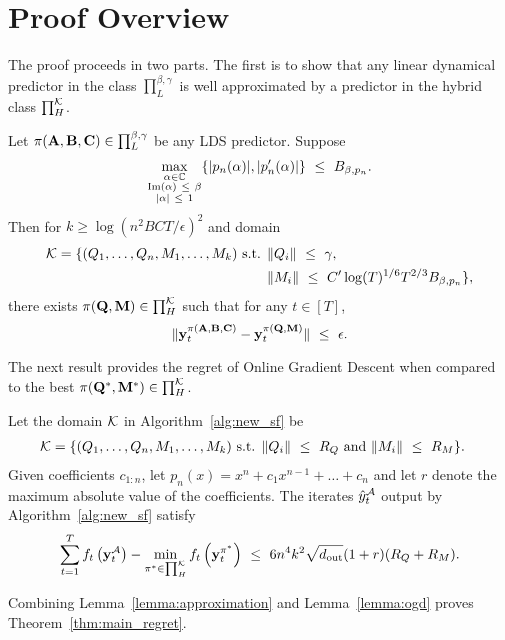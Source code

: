 \section{Proof Overview}
The proof proceeds in two parts. The first is to show that any linear dynamical predictor in the class $\prod_{L}^{\beta, \gamma }$ is well approximated by a predictor in the hybrid class $\prod_{H}^{\mathcal{K}}$. 
\begin{lemma}
\label{lemma:approximation}
    Let $\pi(\mathbf{A}, \mathbf{B}, \mathbf{C}) \in \prod_{L}^{\beta, \gamma }$ be any LDS predictor. Suppose $$\max_{ \substack{ \alpha \in \mathbb{C} \\  \mathrm{Im}(\alpha) ~\le~ \beta  \\ |\alpha| ~\le~ 1 } } \{ |p_n(\alpha)|, |p_n'(\alpha)| \} ~\le~ B_{\beta, p_n} . $$ 
    Then for $k \geq \log(n^2 BC T /\epsilon)^2$ and domain 
    \begin{align*}
    \mathcal{K} =  \{ (Q_1, \dots, Q_n, M_1, \dots, M_k) \textrm{ s.t. } & \|Q_i\| ~\le~ \gamma, \\
    & \|M_i\| ~\le~ C' \log(T)^{1/6} T^{2/3} B_{\beta, p_n} \}, 
\end{align*}
 there exists $\pi(\mathbf{Q}, \mathbf{M}) \in  \prod_H^{\mathcal{K}}$ such that for any $t \in [T]$,
    \begin{equation}
        \| \mathbf{y}^{\pi(\mathbf{A}, \mathbf{B}, \mathbf{C})}_t - \mathbf{y}^{\pi(\mathbf{Q}, \mathbf{M})}_t\| ~\le~ \epsilon. 
    \end{equation}
\end{lemma}
The next result provides the regret of Online Gradient Descent when compared to the best $\pi(\mathbf{Q}^*, \mathbf{M}^*) \in \prod_{H}^{\mathcal{K}}$. 
\begin{lemma}
\label{lemma:ogd}
Let the domain $\mathcal{K}$ in Algorithm~\ref{alg:new_sf} be
\begin{align*}
    \mathcal{K} =  \{ (Q_1, \dots, Q_n, M_1, \dots, M_k) \textrm{ s.t. } & \|Q_i\| ~\le~ R_Q \textrm{ and } \|M_i\| ~\le~ R_M \}. 
\end{align*}
Given coefficients $c_{1:n}$, let $p_n(x) = x^n + c_1 x^{n-1} + \dots + c_n$ and let $r$ denote the maximum absolute value of the coefficients. 
The iterates $\hat{y}_t^{{\mathcal A}}$ output by Algorithm~\ref{alg:new_sf} satisfy 
\begin{equation*}
        \sum_{t = 1}^T f_t\left( \mathbf{y}_t^{{\mathcal A}}\right) - \min_{\pi^* \in \prod_{H}^{\mathcal{K}}} f_t \left( \mathbf{y}_t^{\pi^*}\right) ~\le~  6 n^4 k^2 \sqrt{d_{\textrm{out}}} (1 + r) (R_Q + R_M).
    \end{equation*}
\end{lemma}
Combining Lemma~\ref{lemma:approximation} and Lemma~\ref{lemma:ogd} proves Theorem~\ref{thm:main_regret}. 
